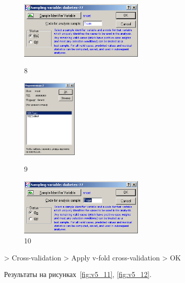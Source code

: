 \begin{figure}[!h]
  \centering

  \begin{minipage}{0.32\textwidth}
    \centering

    \includegraphics[width=6cm]
    {inc/v5_8.PNG}

    \caption{8}

    \label{fig:v5_8}
  \end{minipage}
  \begin{minipage}{0.32\textwidth}
    \centering

    \includegraphics[height=3.8cm]
    {inc/v5_9.PNG}

    \caption{9}

    \label{fig:v5_9}
  \end{minipage}
  \begin{minipage}{0.32\textwidth}
    \centering

    \includegraphics[width=6cm]
    {inc/v5_10.PNG}

    \caption{10}

    \label{fig:v5_10}
  \end{minipage}
\end{figure}

\newpage

> Cross-validation > Apply v-fold cross-validation > OK

Результаты на рисунках~\ref{fig:v5_11}, \ref{fig:v5_12}.

